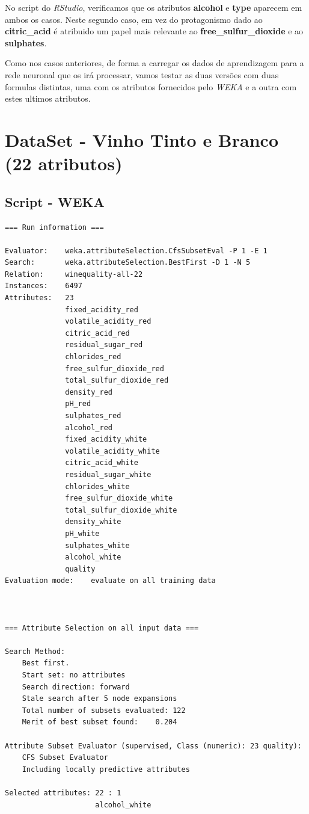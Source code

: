 \documentclass{report}
\begin{document}
No script do \textit{RStudio}, verificamos que os atributos \textbf{alcohol} e \textbf{type} aparecem em ambos os casos. Neste segundo caso, em vez do protagonismo dado ao \textbf{citric\_acid} é atribuido um papel mais relevante ao \textbf{free\_sulfur\_dioxide} e ao \textbf{sulphates}.

Como nos casos anteriores, de forma a carregar os dados de aprendizagem para a rede neuronal que os irá processar, vamos testar as duas versões com duas formulas distintas, uma com os atributos fornecidos pelo \textit{WEKA} e a outra com estes ultimos atributos.
























\section{DataSet - Vinho Tinto e Branco (22 atributos)}
\subsection{Script - WEKA}
\begin{verbatim}
=== Run information ===

Evaluator:    weka.attributeSelection.CfsSubsetEval -P 1 -E 1
Search:       weka.attributeSelection.BestFirst -D 1 -N 5
Relation:     winequality-all-22
Instances:    6497
Attributes:   23
              fixed_acidity_red
              volatile_acidity_red
              citric_acid_red
              residual_sugar_red
              chlorides_red
              free_sulfur_dioxide_red
              total_sulfur_dioxide_red
              density_red
              pH_red
              sulphates_red
              alcohol_red
              fixed_acidity_white
              volatile_acidity_white
              citric_acid_white
              residual_sugar_white
              chlorides_white
              free_sulfur_dioxide_white
              total_sulfur_dioxide_white
              density_white
              pH_white
              sulphates_white
              alcohol_white
              quality
Evaluation mode:    evaluate on all training data



=== Attribute Selection on all input data ===

Search Method:
	Best first.
	Start set: no attributes
	Search direction: forward
	Stale search after 5 node expansions
	Total number of subsets evaluated: 122
	Merit of best subset found:    0.204

Attribute Subset Evaluator (supervised, Class (numeric): 23 quality):
	CFS Subset Evaluator
	Including locally predictive attributes

Selected attributes: 22 : 1
                     alcohol_white
\end{verbatim}
\end{document}
